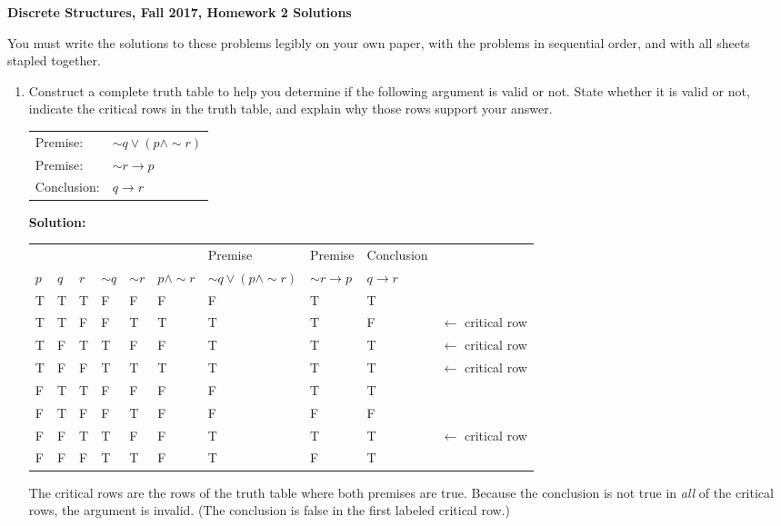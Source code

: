 \documentclass[12pt, letterpaper]{report}
\newcommand{\nott}{{\sim}}
\newcommand{\sol}{\textbf{Solution: }}
\begin{document}
{\textbf{Discrete Structures, Fall 2017, Homework 2 Solutions}}

\medbreak

You must write the solutions to these problems legibly on your own paper, with
the problems in sequential order, and with all sheets stapled together.

\medbreak

\begin{enumerate}

	\item Construct a complete truth table to help you determine if the following 
	argument is valid or not. State whether it is valid or not, indicate the critical rows in the truth table, 
	and explain why those rows support your answer.
	
	\begin{tabular}{ll}
		Premise: & $\nott q \lor (p \land \nott r)$ \\
		Premise: & $\nott r \to p$ \\
		Conclusion: & $q \to r$
	\end{tabular}
	
	     \sol      
	       
        \begin{tabular}{|l|l|l|l|l|l|l|l|l|l|} \hline
        &&&&&&Premise&Premise&Conclusion&\\
        $p$ & $q$ & $r$ & $\nott q$ & $\nott r$ & $p \land \nott r$ & $\nott q \lor (p \land \nott r)$ & $\nott r \to p$ & $q \to r$ & \\ \hline
         T & T & T & F & F & F & F & T & T &\\ \hline
         T & T & F & F & T & T & T & T & F &$\gets$ critical row\\ \hline
         T & F & T & T & F & F & T & T & T &$\gets$ critical row\\ \hline
         T & F & F & T & T & T & T & T & T &$\gets$ critical row\\ \hline
         F & T & T & F & F & F & F & T & T &\\ \hline
         F & T & F & F & T & F & F & F & F &\\ \hline
         F & F & T & T & F & F & T & T & T &$\gets$ critical row\\ \hline
         F & F & F & T & T & F & T & F & T &\\ \hline

        \end{tabular}
        
         The critical rows are the rows of the truth table where both premises
        are true.  Because the conclusion is not true in \emph{all} of the critical rows,  the argument
        is invalid.  (The conclusion is false in the first labeled critical row.)


\end{enumerate}
\end{document}
